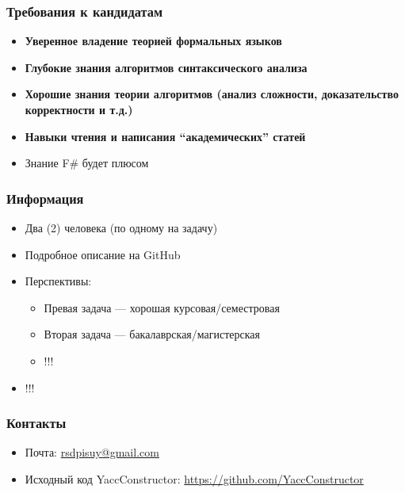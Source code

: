 \documentclass{beamer}
\begin{document}
\begin{frame}[fragile]
\transwipe[direction=90]
\frametitle{Требования к кандидатам}
  \begin{itemize}
    \item \textbf{Уверенное владение теорией формальных языков}
    \item \textbf{Глубокие знания алгоритмов синтаксического анализа}
    \item \textbf{Хорошие знания теории алгоритмов (анализ сложности, доказательство корректности и т.д.)}
    \item \textbf{Навыки чтения и написания ``академических'' статей}
    \item Знание F\# будет плюсом
  \end{itemize}  
\end{frame}

\begin{frame}[fragile]
\transwipe[direction=90]
\frametitle{Информация}
  \begin{itemize}
    \item Два (2) человека (по одному на задачу)
    \item Подробное описание на GitHub
    \item Перспективы: 
    \begin{itemize}
      \item Превая задача --- хорошая курсовая/семестровая
      \item Вторая задача --- бакалаврская/магистерская 
      \item !!!
    \end{itemize}  

    \item !!!
  \end{itemize}  
\end{frame}


\begin{frame}
\transwipe[direction=90]
\frametitle{Контакты}
\begin{itemize}
  \item Почта: \url{rsdpisuy@gmail.com}
  \item Исходный код YaccConstructor: \url{https://github.com/YaccConstructor}
\end{itemize}
\end{frame}
\end{document}
